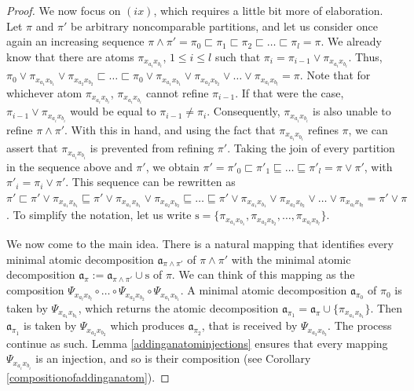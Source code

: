\documentclass[12pt]{extarticle}
\begin{document}
\begin{proof}
		We now focus on $(ix)$, which requires a little bit more of elaboration. Let $\pi$ and $\pi'$ be arbitrary noncomparable partitions, and let us consider once again an increasing sequence $\pi\wedge\pi'=\pi_0\sqsubset\pi_1\sqsubset\pi_2\sqsubset\dots\sqsubset\pi_l=\pi$. We already know that there are atoms $\pi_{x_{a_i}x_{b_i}}$, $1\leq i\leq l$ such that $\pi_i=\pi_{i-1}\vee \pi_{x_{a_i}x_{b_i}}$.  Thus, 
		$\pi_0\vee\pi_{x_{a_1}x_{b_1}}\vee\pi_{x_{a_2}x_{b_2}}\sqsubset\dots\sqsubset\pi_0\vee\pi_{x_{a_1}x_{b_1}}\vee\pi_{x_{a_2}x_{b_2}}\vee\ldots\vee\pi_{x_{a_l}x_{b_l}}=\pi.$
		Note that for whichever atom $\pi_{x_{a_i}x_{b_i}}$, $\pi_{x_{a_i}x_{b_i}}$ cannot refine $\pi_{i-1}$. If that were the case, $\pi_{i-1}\vee \pi_{x_{a_i}x_{b_i}}$ would be equal to $\pi_{i-1}\neq \pi_{i}$. Consequently, $\pi_{x_{a_i}x_{b_i}}$ is also unable to refine $ \pi\wedge \pi'$. With this in hand, and using the fact that $\pi_{x_{a_i}x_{b_i}}$ refines $\pi$, we can assert that $\pi_{x_{a_i}x_{b_i}}$ is prevented from refining $\pi'$.
		Taking the join of every partition in the sequence above and $\pi'$, we obtain $\pi'=\pi'_0\sqsubset\pi'_1\sqsubseteq\dots\sqsubseteq\pi'_l=\pi\vee \pi'$, with $\pi'_i=\pi_i\vee \pi'$. This sequence can be rewritten as
		$\pi' \sqsubset\pi'\vee\pi_{x_{a_1}x_{b_1}} \sqsubseteq \pi'\vee\pi_{x_{a_1}x_{b_1}}\vee\pi_{x_{a_2}x_{b_2}}\sqsubseteq\dots\sqsubseteq\pi'\vee\pi_{x_{a_1}x_{b_1}}\vee\pi_{x_{a_2}x_{b_2}}\vee\ldots\vee\pi_{x_{a_l}x_{b_l}}=\pi'\vee \pi$. To simplify the notation, let us write $\textrm{s}= \{\pi_{x_{a_1}x_{b_1}},\pi_{x_{a_2}x_{b_2}},\ldots,\pi_{x_{a_l}x_{b_l}}\}$.
		
		
		We now come to the main idea. There is a natural mapping that identifies every minimal atomic decomposition $\mathfrak{a}_{\pi\wedge\pi'}$ of $\pi\wedge\pi'$ with the minimal atomic decomposition $\mathfrak{a}_{\pi}:=\mathfrak{a}_{\pi\wedge\pi'}\cup\textrm{s}$ of $\pi$. We can think of this mapping as the composition $\Psi_{x_{a_l}x_{b_l}}\circ\ldots \circ\Psi_{x_{a_2}x_{b_2}}\circ\Psi_{x_{a_1}x_{b_1}}$. A minimal atomic decomposition $\mathfrak{a}_{\pi_0}$ of $\pi_0$ is taken by $\Psi_{x_{a_1}x_{b_1}}$, which returns the atomic decomposition $\mathfrak{a}_{\pi_1}= \mathfrak{a}_{\pi}\cup \{\pi_{x_{a_1}x_{b_1}} \}$. Then $\mathfrak{a}_{\pi_1}$ is taken by $\Psi_{x_{a_2}x_{b_2}}$ which produces $\mathfrak{a}_{\pi_2}$, that is received by $\Psi_{x_{a_3}x_{b_3}}$. The process continue as such. Lemma \ref{addinganatominjections} ensures that every mapping $\Psi_{x_{a_i}x_{b_i}}$ is an injection, and so is their composition (see Corollary \ref{compositionofaddinganatom}).
		

\end{proof}
\end{document}
